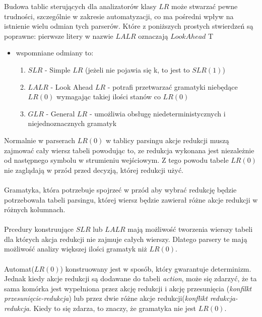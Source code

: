 \answer
{Budowa tablic sterujących dla analizatorów klasy $LR$ może stwarzać pewne trudności, szczególnie w zakresie automatyzacji, co ma pośredni wpływ na istnienie
wielu odmian tych parserów. Które z poniższych prostych stwierdzeń są poprawne:}
{pierwsze litery w nazwie $LALR$ oznaczają $Look Ahead$}
{T}
{\begin{itemize}
\item wspomniane odmiany to:
    \begin{enumerate}
    \item $SLR$ - Simple $LR$ (jeżeli nie pojawia się k, to jest to $SLR(1)$)
    \item $LALR$ - Look Ahead $LR$ - potrafi przetwarzać gramatyki niebędące $LR(0)$ wymagając takiej ilości stanów co $LR(0)$
    \item $GLR$ - General $LR$ - umożliwia obsługę niedeterministycznych i niejednoznacznych gramatyk
    \end{enumerate}
\end{itemize}

Normalnie w parserach $LR(0)$ w tablicy parsingu akcje redukcji muszą zajmować cały wiersz tabeli powodując to, ze redukcja wykonana jest niezależnie od następnego symbolu w strumieniu wejściowym. Z tego powodu tabele $LR(0)$ nie zaglądają w przód przed decyzją, której redukcji użyć. 
\\~\\
Gramatyka, która potrzebuje spojrzeć w przód aby wybrać redukcję będzie potrzebowała tabeli parsingu, której wiersz będzie zawierał różne akcje redukcji w różnych kolumnach. 
\\~\\
Prcedury konstruujące $SLR$ lub $LALR$ mają możliwość tworzenia wierszy tabeli dla których akcja redukcji nie zajmuje całych wierszy. Dlatego parsery te mają możliwość analizy większej ilości gramatyk niż $LR(0)$.
\\~\\
Automat($LR(0)$) konstruowany jest w sposób, który gwarantuje determinizm. Jednak kiedy akcje redukcji są dodawane do tabeli \textit{action}, może się zdarzyć, że ta sama komórka jest wypełniona przez akcję redukcji i akcję przesunięcia (\textit{konfilkt przesunięcie-redukcja}) lub przez dwie różne akcje redukcji(\textit{konflikt redukcja-redukcja}. Kiedy to się zdarza, to znaczy, że gramatyka nie jest $LR(0)$.

}
